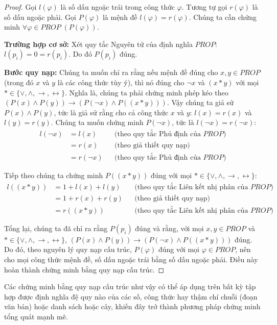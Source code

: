 \begin{proof}
Gọi $l(\varphi)$ là số dấu ngoặc trái trong công thức $\varphi$. Tương tự gọi $r(\varphi)$ là số dấu ngoặc phải. Gọi $P(\varphi)$ là mệnh đề $l(\varphi) = r(\varphi)$. Chúng ta cần chứng minh $\forall \varphi \in PROP\;(P(\varphi))$.

\textbf{Trường hợp cơ sở:} Xét quy tắc Nguyên tử của định nghĩa $PROP$: $l(p_i) = 0 = r(p_i)$. Do đó $P(p_i)$ đúng.

\textbf{Bước quy nạp:} Chúng ta muốn chỉ ra rằng nếu mệnh đề đúng cho $x, y \in PROP$ (trong đó $x$ và $y$ là các công thức tùy ý), thì nó đúng cho $\neg x$ và $(x \ast y)$ với mọi $\ast \in \{\lor, \land, \to, \leftrightarrow\}$. Nghĩa là, chúng ta phải chứng minh phép kéo theo $(P(x) \land P(y)) \to (P(\neg x) \land P((x \ast y)))$. Vậy chúng ta giả sử $P(x) \land P(y)$, tức là giả sử rằng cho cả công thức $x$ và $y$: $l(x) = r(x)$ và $l(y) = r(y)$. Chúng ta muốn chứng minh $P(\neg x)$, tức là $l(\neg x) = r(\neg x)$:
\begin{align*}
l(\neg x) &= l(x) & &\text{(theo quy tắc Phủ định của } PROP\text{)} \\
&= r(x) & &\text{(theo giả thiết quy nạp)} \\
&= r(\neg x) & &\text{(theo quy tắc Phủ định của } PROP\text{)}
\end{align*}

Tiếp theo chúng ta chứng minh $P((x \ast y))$ đúng với mọi $\ast \in \{\lor, \land, \to, \leftrightarrow\}$:
\begin{align*}
l((x \ast y)) &= 1 + l(x) + l(y) & &\text{(theo quy tắc Liên kết nhị phân của } PROP\text{)} \\
&= 1 + r(x) + r(y) & &\text{(theo giả thiết quy nạp)} \\
&= r((x \ast y)) & &\text{(theo quy tắc Liên kết nhị phân của } PROP\text{)}
\end{align*}

Tổng lại, chúng ta đã chỉ ra rằng $P(p_i)$ đúng và rằng, với mọi $x, y \in PROP$ và $\ast \in \{\lor, \land, \to, \leftrightarrow\}$, $(P(x) \land P(y)) \to (P(\neg x) \land P((x \ast y)))$ đúng. Do đó, theo nguyên lý quy nạp cấu trúc, $P(\varphi)$ đúng với mọi $\varphi \in PROP$, nên cho mọi công thức mệnh đề, số dấu ngoặc trái bằng số dấu ngoặc phải. Điều này hoàn thành chứng minh bằng quy nạp cấu trúc.
\end{proof}

Các chứng minh bằng quy nạp cấu trúc như vậy có thể áp dụng trên bất kỳ tập hợp được định nghĩa đệ quy nào của các số, công thức hay thậm chí chuỗi (đoạn văn bản) hoặc danh sách hoặc cây, khiến đây trở thành phương pháp chứng minh tổng quát mạnh mẽ.

